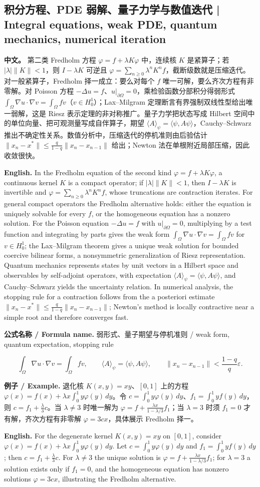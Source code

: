 \documentclass[UTF8,11pt,a4paper]{ctexart}
\newcommand{\EN}[1]{\par\noindent \textbf{English.} #1\par}
\newcommand{\FORMULA}[2]{\par\noindent\textbf{公式名称 / Formula name.} #1 / #2\par}
\newcommand{\EX}[2]{\par\noindent \textbf{例子 / Example.} #1\par\EN{#2}}
\newcommand{\APS}[2]{\par\noindent\textbf{中文。} #1\par\noindent\textbf{English.} #2\par\smallskip}
\begin{document}
\subsection{积分方程、PDE 弱解、量子力学与数值迭代 | Integral equations, weak PDE, quantum mechanics, numerical iteration}
\APS{第二类 Fredholm 方程 $\varphi=f+\lambda K\varphi$ 中，连续核 $K$ 是紧算子；若 $|\lambda|\|K\|<1$，则 $I-\lambda K$ 可逆且 $\varphi=\sum_{n\ge0}\lambda^nK^nf$，截断级数就是压缩迭代。对一般紧算子，Fredholm 择一成立：要么对每个 $f$ 唯一可解，要么齐次方程有非零解。对 Poisson 方程 $-\Delta u=f$、$u|_{\partial\Omega}=0$，乘检验函数分部积分得弱形式 $\int_\Omega\nabla u\cdot\nabla v=\int_\Omega fv$（$v\in H_0^1$）；Lax--Milgram 定理断言有界强制双线性型给出唯一弱解，这是 Riesz 表示定理的非对称推广。量子力学把状态写成 Hilbert 空间中的单位向量、把可观测量写成自伴算子，期望 $\langle A\rangle_\psi=\langle\psi,A\psi\rangle$，Cauchy--Schwarz 推出不确定性关系。数值分析中，压缩迭代的停机准则由后验估计 $\|x_n-x^*\|\le\frac{q}{1-q}\|x_n-x_{n-1}\|$ 给出；Newton 法在单根附近局部压缩，因此收敛很快。}{In the Fredholm equation of the second kind $\varphi=f+\lambda K\varphi$, a continuous kernel $K$ is a compact operator; if $|\lambda|\|K\|<1$, then $I-\lambda K$ is invertible and $\varphi=\sum_{n\ge0}\lambda^nK^nf$, whose truncations are contraction iterates. For general compact operators the Fredholm alternative holds: either the equation is uniquely solvable for every $f$, or the homogeneous equation has a nonzero solution. For the Poisson equation $-\Delta u=f$ with $u|_{\partial\Omega}=0$, multiplying by a test function and integrating by parts gives the weak form $\int_\Omega\nabla u\cdot\nabla v=\int_\Omega fv$ for $v\in H_0^1$; the Lax--Milgram theorem gives a unique weak solution for bounded coercive bilinear forms, a nonsymmetric generalization of Riesz representation. Quantum mechanics represents states by unit vectors in a Hilbert space and observables by self-adjoint operators, with expectation $\langle A\rangle_\psi=\langle\psi,A\psi\rangle$, and Cauchy--Schwarz yields the uncertainty relation. In numerical analysis, the stopping rule for a contraction follows from the a posteriori estimate $\|x_n-x^*\|\le\frac{q}{1-q}\|x_n-x_{n-1}\|$; Newton's method is locally contractive near a simple root and therefore converges fast.}
\FORMULA{弱形式、量子期望与停机准则}{weak form, quantum expectation, stopping rule}
\[
\int_\Omega\nabla u\cdot\nabla v=\int_\Omega fv,
\qquad
\langle A\rangle_\psi=\langle\psi,A\psi\rangle,
\qquad
\|x_n-x_{n-1}\|<\frac{1-q}{q}\varepsilon.
\]
\EX{退化核 $K(x,y)=xy$、$[0,1]$ 上的方程 $\varphi(x)=f(x)+\lambda x\int_0^1y\varphi(y)\,dy$。令 $c=\int_0^1y\varphi(y)\,dy$、$f_1=\int_0^1yf(y)\,dy$，则 $c=f_1+\frac{\lambda}{3}c$。当 $\lambda\ne3$ 时唯一解为 $\varphi=f+\frac{\lambda x}{1-\lambda/3}f_1$；当 $\lambda=3$ 时须 $f_1=0$ 才有解，齐次方程有非零解 $\varphi=3cx$，具体展示 Fredholm 择一。}{For the degenerate kernel $K(x,y)=xy$ on $[0,1]$, consider $\varphi(x)=f(x)+\lambda x\int_0^1y\varphi(y)\,dy$. Let $c=\int_0^1y\varphi(y)\,dy$ and $f_1=\int_0^1yf(y)\,dy$; then $c=f_1+\frac{\lambda}{3}c$. For $\lambda\ne3$ the unique solution is $\varphi=f+\frac{\lambda x}{1-\lambda/3}f_1$; for $\lambda=3$ a solution exists only if $f_1=0$, and the homogeneous equation has nonzero solutions $\varphi=3cx$, illustrating the Fredholm alternative.}
\end{document}
